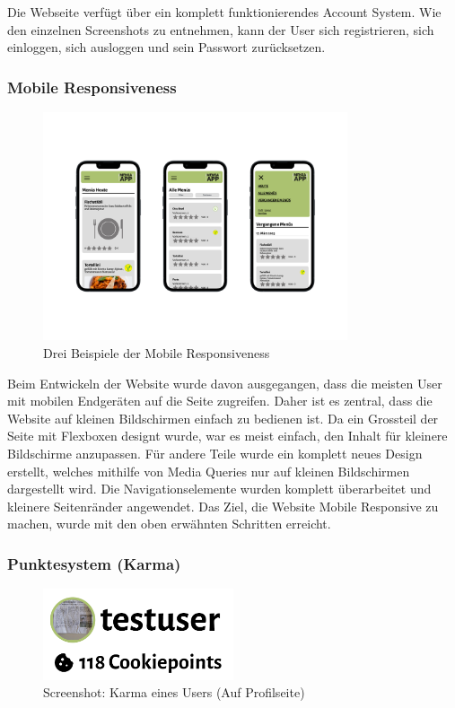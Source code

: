 Die Webseite verfügt über ein komplett funktionierendes Account System. Wie den
einzelnen Screenshots zu entnehmen, kann der User sich registrieren, sich
einloggen, sich ausloggen und sein Passwort zurücksetzen.

\subsubsection*{Mobile Responsiveness}

\begin{figure}[ht]
    \centering
    \includegraphics[width=0.8\textwidth]{images/Resultat_Responsive.png}
    \caption{Drei Beispiele der Mobile Responsiveness}
    \label{fig:r-karma}
\end{figure}

Beim Entwickeln der Website wurde davon ausgegangen, dass die meisten User mit
mobilen Endgeräten auf die Seite zugreifen. Daher ist es zentral, dass die
Website auf kleinen Bildschirmen einfach zu bedienen ist. Da ein Grossteil der
Seite mit Flexboxen designt wurde, war es meist einfach, den Inhalt für kleinere
Bildschirme anzupassen. Für andere Teile wurde ein komplett neues Design
erstellt, welches mithilfe von Media Queries nur auf kleinen Bildschirmen
dargestellt wird. Die Navigationselemente wurden komplett überarbeitet und
kleinere Seitenränder angewendet. Das Ziel, die Website Mobile Responsive zu
machen, wurde mit den oben erwähnten Schritten erreicht.


\subsubsection*{Punktesystem (Karma)}

\begin{figure}[ht]
    \centering
    \includegraphics[width=0.5\textwidth]{images/Resultat_Karma.png}
    \caption{Screenshot: Karma eines Users (Auf Profilseite)}
    \label{fig:r-karma}
\end{figure}

